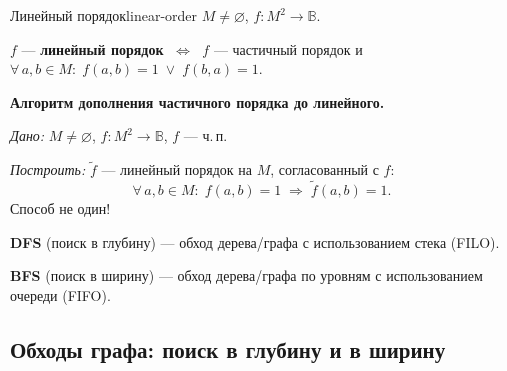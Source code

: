 \begin{defn}{Линейный порядок}{linear-order}
$M \neq \varnothing$,\; $f\colon M^2 \to \mathbb{B}$.

$f$ --- \textbf{линейный порядок} $\;\Leftrightarrow\;$
$f$ --- частичный порядок и
$\forall\, a, b \in M\colon\; f(a,b) = 1 \;\vee\; f(b,a) = 1$.
\end{defn}

\medskip
\textbf{Алгоритм дополнения частичного порядка до линейного.}

\textit{Дано:} $M \neq \varnothing$,\; $f\colon M^2 \to \mathbb{B}$,\; $f$ --- ч.\,п.

\textit{Построить:} $\tilde{f}$ --- линейный порядок на $M$, согласованный с $f$:
\[
  \forall\, a, b \in M\colon\;
  f(a,b) = 1 \;\Rightarrow\; \tilde{f}(a,b) = 1.
\]
Способ не один!

\bigskip
\textbf{DFS} (поиск в глубину) --- обход дерева/графа с использованием стека (FILO).


\textbf{BFS} (поиск в ширину) --- обход дерева/графа по уровням
с использованием очереди (FIFO).


\subsection*{Обходы графа: поиск в глубину и в ширину}

